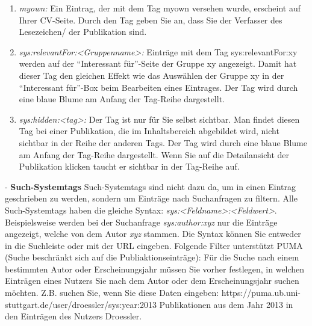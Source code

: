 \documentclass[a4paper,11pt,twoside]{scrbook}
\begin{document}
\begin{enumerate}
    \item \textit{myown:} Ein Eintrag, der mit dem Tag myown versehen wurde, erscheint auf Ihrer CV-Seite. Durch den Tag geben Sie an, dass Sie der Verfasser des Lesezeichen/ der Publikation sind.
    \item \textit{sys:relevantFor:<Gruppenname>:} Einträge mit dem Tag sys:relevantFor:xy werden auf der \enquote{Interessant für}-Seite der Gruppe xy angezeigt. Damit hat dieser Tag den gleichen Effekt wie das  Auswählen der Gruppe xy in der \enquote{Interessant für}-Box beim Bearbeiten eines Eintrages. Der Tag wird durch eine blaue Blume am Anfang der Tag-Reihe dargestellt. 
    \item \textit{sys:hidden:<tag>:} Der Tag ist nur für Sie selbst sichtbar. Man findet diesen Tag bei einer Publikation, die im Inhaltsbereich abgebildet wird, nicht sichtbar in der Reihe der anderen Tags. Der Tag wird durch eine blaue Blume am Anfang der Tag-Reihe dargestellt. Wenn Sie auf die Detailansicht der Publikation klicken taucht er sichtbar in der Tag-Reihe auf.
\end{enumerate}
- \textbf{Such-Systemtags}\newline
Such-Systemtags sind nicht dazu da, um in einen Eintrag geschrieben zu werden, sondern um Einträge nach Suchanfragen zu filtern. Alle Such-Systemtags haben die gleiche Syntax: \textit{sys:<Feldname>:<Feldwert>}. Beispielsweise werden  bei der Suchanfrage \textit{sys:author:xyz} nur die Einträge angezeigt, welche von dem Autor \textit{xyz} stammen.\newline
Die Syntax können Sie entweder in die Suchleiste oder mit der URL eingeben. Folgende Filter unterstützt PUMA (Suche beschränkt sich auf die Publiaktionseinträge):\newline
\newline
Für die Suche nach einem bestimmten Autor oder Erscheinungsjahr müssen Sie vorher festlegen, in welchen Einträgen eines Nutzers Sie nach dem Autor oder dem Erscheinungsjahr suchen möchten. Z.B. suchen Sie, wenn Sie diese Daten eingeben:  https://puma.ub.uni-stuttgart.de/user/droessler/sys:year:2013  Publikationen aus dem Jahr 2013 in den Einträgen des Nutzers Droessler. 
\end{document}
